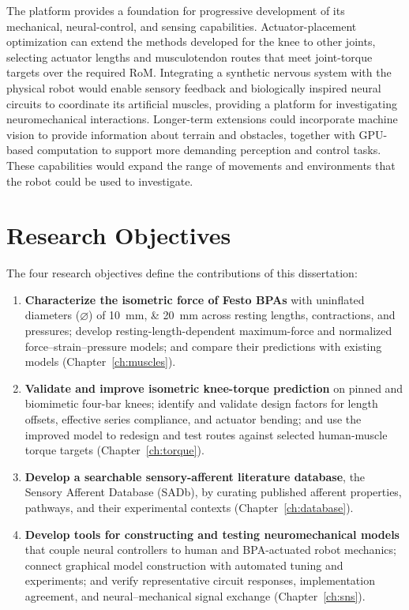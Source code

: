 The platform provides a foundation for progressive development of its mechanical, neural-control, and sensing capabilities. Actuator-placement optimization can extend the methods developed for the knee to other joints, selecting actuator lengths and musculotendon routes that meet joint-torque targets over the required RoM. Integrating a synthetic nervous system with the physical robot would enable sensory feedback and biologically inspired neural circuits to coordinate its artificial muscles, providing a platform for investigating neuromechanical interactions. Longer-term extensions could incorporate machine vision to provide information about terrain and obstacles, together with GPU-based computation to support more demanding perception and control tasks. These capabilities would expand the range of movements and environments that the robot could be used to investigate.

\section{Research Objectives}\label{sec:objectives}

The four research objectives define the contributions of this dissertation:

\begin{enumerate}
    \item \textbf{Characterize the isometric force of Festo BPAs} with uninflated diameters ($\diameter$) of \qtylist{10;20}{\mm} across resting lengths, contractions, and pressures; develop resting-length-dependent maximum-force and normalized force--strain--pressure models; and compare their predictions with existing models (Chapter~\ref{ch:muscles}).
    \item \textbf{Validate and improve isometric knee-torque prediction} on pinned and biomimetic four-bar knees; identify and validate design factors for length offsets, effective series compliance, and actuator bending; and use the improved model to redesign and test routes against selected human-muscle torque targets (Chapter~\ref{ch:torque}).
    \item \textbf{Develop a searchable sensory-afferent literature database}, the Sensory Afferent Database (SADb), by curating published afferent properties, pathways, and their experimental contexts (Chapter~\ref{ch:database}).
    \item \textbf{Develop tools for constructing and testing neuromechanical models} that couple neural controllers to human and BPA-actuated robot mechanics; connect graphical model construction with automated tuning and experiments; and verify representative circuit responses, implementation agreement, and neural--mechanical signal exchange (Chapter~\ref{ch:sns}).
\end{enumerate}

